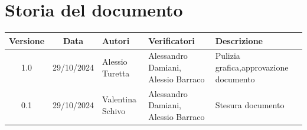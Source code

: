 \section{Storia del documento}
\begin{tabularx}{\textwidth}{ c c p{3cm} p{3.17cm} X }
    \rowcolor{gray!20}\rule{0pt}{0.5cm}\textbf{Versione} & \textbf{Data} & \textbf{Autori} & \textbf{Verificatori} & \textbf{Descrizione} \\[0.7ex]
    \hline
    \rule{0pt}{0.5cm}1.0 & 29/10/2024 & Alessio Turetta & Alessandro Damiani, \newline Alessio Barraco & Pulizia grafica,\newline approvazione documento\\[3.5ex]
    \hline
    \rule{0pt}{0.5cm}0.1 & 29/10/2024 & Valentina Schivo & Alessandro Damiani, \newline Alessio Barraco & Stesura documento\\[0.7ex] 
\end{tabularx}
